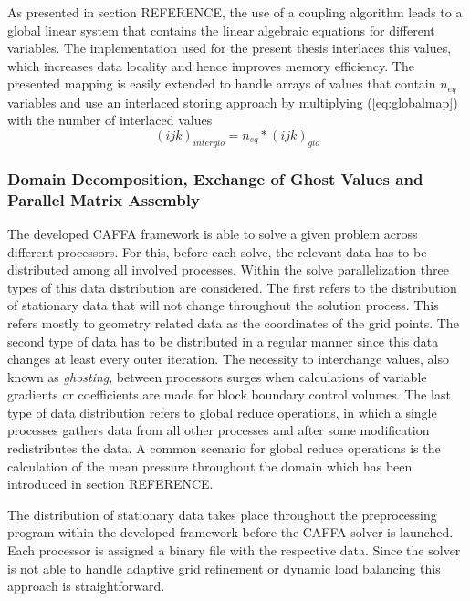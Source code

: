 As presented in section REFERENCE, the use of a coupling algorithm leads to a global linear system that contains the linear algebraic equations for different variables. The implementation used for the present thesis interlaces this values, which increases data locality and hence improves memory efficiency. The presented mapping is easily extended to handle arrays of values that contain \(n_{eq}\) variables and use an interlaced storing approach by multiplying (\ref{eq:globalmap}) with the number of interlaced values
\begin{displaymath}
  (ijk)_{interglo} = n_{eq} * (ijk)_{glo} 
\end{displaymath}

\subsubsection{Domain Decomposition, Exchange of Ghost Values and Parallel Matrix Assembly}

The developed CAFFA framework is able to solve a given problem across different processors. For this, before each solve, the relevant data has to be distributed among all involved processes. Within the solve parallelization three types of this data distribution are considered. The first refers to the distribution of stationary data that will not change throughout the solution process. This refers mostly to geometry related data as the coordinates of the grid points. The second type of data has to be distributed in a regular manner since this data changes at least every outer iteration. The necessity to interchange values, also known as \emph{ghosting}, between processors surges when calculations of variable gradients or coefficients are made for block boundary control volumes. The last type of data distribution refers to global reduce operations, in which a single processes gathers data from all other processes and after some modification redistributes the data. A common scenario for global reduce operations is the calculation of the mean pressure throughout the domain which has been introduced in section REFERENCE.

The distribution of stationary data takes place throughout the preprocessing program within the developed framework before the CAFFA solver is launched. Each processor is assigned a binary file with the respective data. Since the solver is not able to handle adaptive grid refinement or dynamic load balancing this approach is straightforward.

